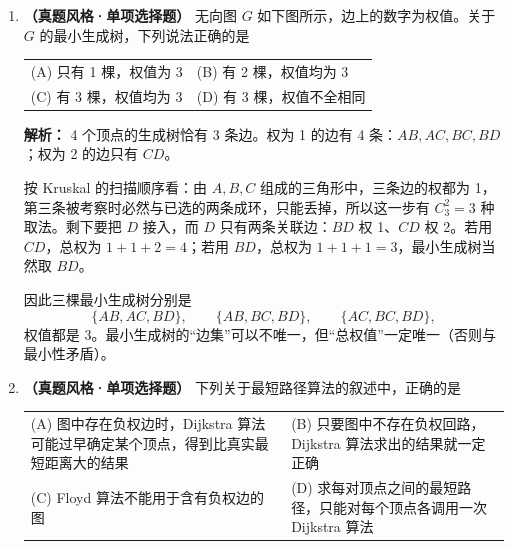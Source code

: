 \begin{enumerate}[resume]

\item \textbf{（真题风格·单项选择题）} 无向图 $G$ 如下图所示，边上的数字为权值。关于 $G$ 的最小生成树，下列说法正确的是
\begin{center}
\end{center}
\begin{center}
\begin{tabular}{ll}
(A) 只有 1 棵，权值为 3 & (B) 有 2 棵，权值均为 3 \\[4pt]
(C) 有 3 棵，权值均为 3 & (D) 有 3 棵，权值不全相同
\end{tabular}
\end{center}

\ifshowsolutions\par\noindent\textbf{解析：} 4 个顶点的生成树恰有 3 条边。权为 1 的边有 4 条：$AB,AC,BC,BD$；权为 2 的边只有 $CD$。

按 Kruskal 的扫描顺序看：由 $A,B,C$ 组成的三角形中，三条边的权都为 1，第三条被考察时必然与已选的两条成环，只能丢掉，所以这一步有 $C_3^2=3$ 种取法。剩下要把 $D$ 接入，而 $D$ 只有两条关联边：$BD$ 权 1、$CD$ 权 2。若用 $CD$，总权为 $1+1+2=4$；若用 $BD$，总权为 $1+1+1=3$，最小生成树当然取 $BD$。

因此三棵最小生成树分别是
\[
\{AB,AC,BD\},\qquad \{AB,BC,BD\},\qquad \{AC,BC,BD\},
\]
权值都是 3。最小生成树的“边集”可以不唯一，但“总权值”一定唯一（否则与最小性矛盾）。

\else \answerarea[6] \fi

\item \textbf{（真题风格·单项选择题）} 下列关于最短路径算法的叙述中，正确的是
\begin{center}
\begin{tabular}{@{}p{7.5cm}p{7.5cm}@{}}
(A) 图中存在负权边时，Dijkstra 算法可能过早确定某个顶点，得到比真实最短距离大的结果 & (B) 只要图中不存在负权回路，Dijkstra 算法求出的结果就一定正确 \\[6pt]
(C) Floyd 算法不能用于含有负权边的图 & (D) 求每对顶点之间的最短路径，只能对每个顶点各调用一次 Dijkstra 算法
\end{tabular}
\end{center}


\end{enumerate}
